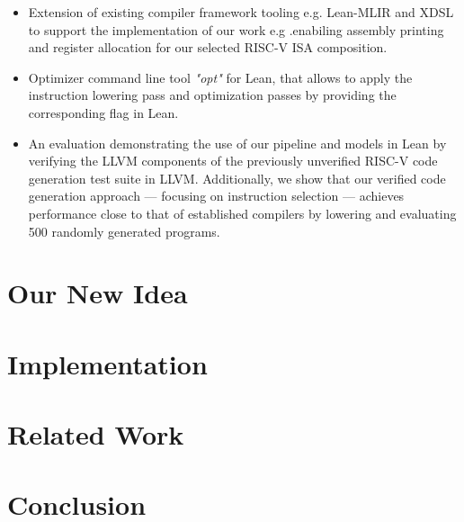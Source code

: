 \documentclass[review, anonymous, acmsmall, screen]{acmart}
\begin{document}
\begin{itemize}
\item {Extension of existing compiler framework tooling e.g. Lean-MLIR and XDSL to support the implementation of our work e.g .enabiling assembly printing and register allocation for our selected RISC-V ISA composition.}

\item {Optimizer command line tool \textit{"opt"} for Lean, that  allows to apply the instruction lowering pass and optimization passes by providing the corresponding flag in Lean.}

\item {An evaluation demonstrating the use of our pipeline and models in Lean by verifying the LLVM components of the previously unverified RISC-V code generation test suite in LLVM. Additionally, we show that our verified code generation approach — focusing on instruction selection — achieves performance close to that of established compilers by lowering and evaluating 500 randomly generated programs.}

\end{itemize}

\section{Our New Idea}

\lipsum[1-3]

\section{Implementation}
\label{sec:implementation}

\section{Related Work}

\lipsum[1-3]


\section{Conclusion}
\lipsum[1]
\end{document}
